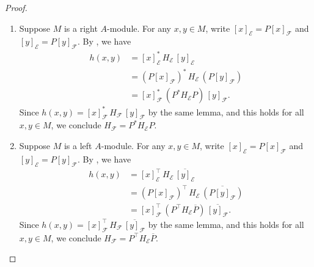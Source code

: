 \begin{proof}
    \begin{enumerate}
        \item Suppose $M$ is a right $A$-module. For any $x,y \in M$, write $[x]_\mathcal{E} = P[x]_\mathcal{F}$ and $[y]_\mathcal{E} = P[y]_\mathcal{F}$. By , we have
        \begin{align*}
            h(x,y) &= [x]_\mathcal{E}^* \, H_\mathcal{E} \, [y]_\mathcal{E} \\
            &= (P[x]_\mathcal{F})^* \, H_\mathcal{E} \, (P[y]_\mathcal{F}) \\
            &= [x]_\mathcal{F}^* \, (P^* H_\mathcal{E} P) \, [y]_\mathcal{F}.
        \end{align*}
        Since $h(x,y) = [x]_\mathcal{F}^* \, H_\mathcal{F} \, [y]_\mathcal{F}$ by the same lemma, and this holds for all $x,y \in M$, we conclude $H_\mathcal{F} = P^* H_\mathcal{E} P$.

        \item Suppose $M$ is a left $A$-module. For any $x,y \in M$, write $[x]_\mathcal{E} = P[x]_\mathcal{F}$ and $[y]_\mathcal{E} = P[y]_\mathcal{F}$. By , we have
        \begin{align*}
            h(x,y) &= [x]_\mathcal{E}^\top \, H_\mathcal{E} \, \overline{[y]_\mathcal{E}} \\
            &= (P[x]_\mathcal{F})^\top \, H_\mathcal{E} \, \overline{(P[y]_\mathcal{F})} \\
            &= [x]_\mathcal{F}^\top \, (P^\top H_\mathcal{E} \overline{P}) \, \overline{[y]_\mathcal{F}}.
        \end{align*}
        Since $h(x,y) = [x]_\mathcal{F}^\top \, H_\mathcal{F} \, \overline{[y]_\mathcal{F}}$ by the same lemma, and this holds for all $x,y \in M$, we conclude $H_\mathcal{F} = P^\top H_\mathcal{E} \overline{P}$.
    \end{enumerate}
\end{proof}